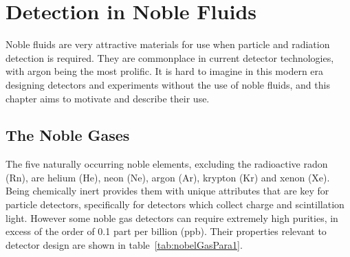 \chapter{Detection in Noble Fluids}
Noble fluids are very attractive materials for use when particle and radiation detection is required. They are commonplace in current detector technologies, with argon being the most prolific. It is hard to imagine in this modern era designing detectors and experiments without the use of noble fluids, and this chapter aims to motivate and describe their use.

\section{The Noble Gases}
The five naturally occurring noble elements, excluding the radioactive radon (Rn), are helium (He), neon (Ne), argon (Ar), krypton (Kr) and xenon (Xe). Being chemically inert provides them with unique attributes that are key for particle detectors, specifically for detectors which collect charge and scintillation light. However some noble gas detectors can require extremely high purities, in excess of the order of 0.1 part per billion (ppb). Their properties relevant to detector design are shown in table~\ref{tab:nobelGasPara1}. 

